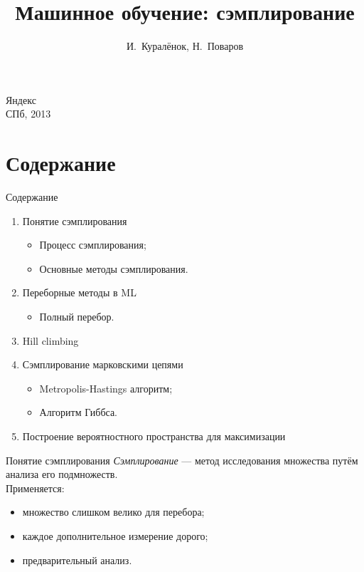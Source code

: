 \documentclass[14pt, fleqn, xcolor={dvipsnames, table}]{beamer}
\title{Машинное обучение: сэмплирование\\\small{}}
\author[]{\small{%
И.~Куралёнок,
Н.~Поваров}}
\date{}
\begin{document}
\begin{frame}
\maketitle
\small
\begin{center}
\vspace{-60pt}
\normalsize {\color{red}Я}ндекс \\
\vspace{80pt}
\footnotesize СПб, 2013
\end{center}
\end{frame}

\section{Содержание}
\begin{frame}{Содержание}
\begin{enumerate}
  \item Понятие сэмплирования
  \begin{itemize}
   \item Процесс сэмплирования;
   \item Основные методы сэмплирования.
  \end{itemize}
  \item Переборные методы в ML
  \begin{itemize}
   \item Полный перебор.
  \end{itemize}
  \item Hill climbing
  \item Сэмплирование марковскими цепями
  \begin{itemize}
   \item Metropolis-Hastings алгоритм;
   \item Алгоритм Гиббса.
  \end{itemize}
  \item Построение вероятностного пространства для максимизации
\end{enumerate}
\end{frame}

\begin{frame}{Понятие сэмплирования}
\textit{Сэмплирование} --- метод исследования множества путём анализа его подмножеств. \\
Применяется:
\begin{itemize}
   \item множество слишком велико для перебора;
   \item каждое дополнительное измерение дорого;
   \item предварительный анализ.
\end{itemize}
\end{frame}
\end{document}

